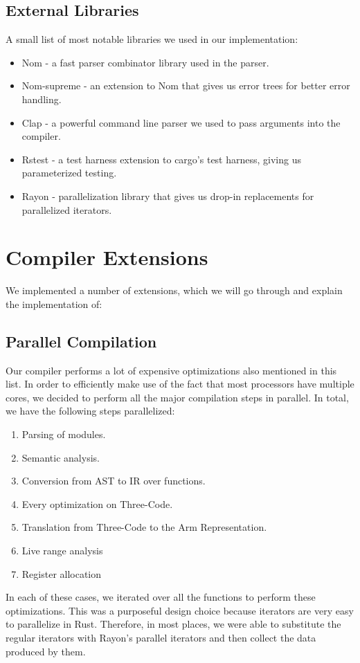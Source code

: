 \documentclass{article}
\newcommand{\compitem}[1]{\begin{itemize}\setlength\itemsep{-0.5em}#1\end{itemize}}
\newcommand{\compenum}[1]{\begin{enumerate}\setlength\itemsep{-0.5em}#1\end{enumerate}}
\begin{document}
        \subsection*{External Libraries}
        A small list of most notable libraries we used in our implementation:
        \compitem{
            \item Nom - a fast parser combinator library used in the parser.
            \item Nom-supreme - an extension to Nom that gives us error trees for better error handling.
            \item Clap - a powerful command line parser we used to pass arguments into the compiler.
            \item Rstest - a test harness extension to cargo's test harness, giving us parameterized testing.
            \item Rayon - parallelization library that gives us drop-in replacements for parallelized iterators.
        }
    \section*{Compiler Extensions}
        We implemented a number of extensions, which we will go through and explain the implementation of:
        \subsection*{Parallel Compilation}
        Our compiler performs a lot of expensive optimizations also mentioned in this list. In order to efficiently make use of the fact that most processors have multiple cores, we decided to perform all the major compilation steps in parallel. In total, we have the following steps parallelized:
        \compenum{
            \item Parsing of modules.
            \item Semantic analysis.
            \item Conversion from AST to IR over functions.
            \item Every optimization on Three-Code.
            \item Translation from Three-Code to the Arm Representation.
            \item Live range analysis
            \item Register allocation
        }
        
        In each of these cases, we iterated over all the functions to perform these optimizations. This was a purposeful design choice because iterators are very easy to parallelize in Rust. Therefore, in most places, we were able to substitute the regular iterators with Rayon's parallel iterators and then collect the data produced by them.
        
\end{document}
